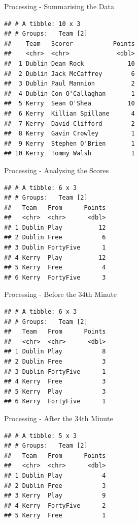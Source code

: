 \documentclass[ignorenonframetext,]{beamer}
\begin{document}
\begin{frame}[fragile]{Processing - Summarising the Data}
\protect\hypertarget{processing---summarising-the-data}{}

\begin{verbatim}
## # A tibble: 10 x 3
## # Groups:   Team [2]
##    Team   Scorer           Points
##    <chr>  <chr>             <dbl>
##  1 Dublin Dean Rock            10
##  2 Dublin Jack McCaffrey        6
##  3 Dublin Paul Mannion          2
##  4 Dublin Con O'Callaghan       1
##  5 Kerry  Sean O'Shea          10
##  6 Kerry  Killian Spillane      4
##  7 Kerry  David Clifford        2
##  8 Kerry  Gavin Crowley         1
##  9 Kerry  Stephen O'Brien       1
## 10 Kerry  Tommy Walsh           1
\end{verbatim}

\end{frame}

\begin{frame}[fragile]{Processing - Analysing the Scores}
\protect\hypertarget{processing---analysing-the-scores}{}

\begin{verbatim}
## # A tibble: 6 x 3
## # Groups:   Team [2]
##   Team   From      Points
##   <chr>  <chr>      <dbl>
## 1 Dublin Play          12
## 2 Dublin Free           6
## 3 Dublin FortyFive      1
## 4 Kerry  Play          12
## 5 Kerry  Free           4
## 6 Kerry  FortyFive      3
\end{verbatim}

\end{frame}

\begin{frame}[fragile]{Processing - Before the 34th Minute}
\protect\hypertarget{processing---before-the-34th-minute}{}

\begin{verbatim}
## # A tibble: 6 x 3
## # Groups:   Team [2]
##   Team   From      Points
##   <chr>  <chr>      <dbl>
## 1 Dublin Play           8
## 2 Dublin Free           3
## 3 Dublin FortyFive      1
## 4 Kerry  Free           3
## 5 Kerry  Play           3
## 6 Kerry  FortyFive      1
\end{verbatim}

\end{frame}

\begin{frame}[fragile]{Processing - After the 34th Minute}
\protect\hypertarget{processing---after-the-34th-minute}{}

\begin{verbatim}
## # A tibble: 5 x 3
## # Groups:   Team [2]
##   Team   From      Points
##   <chr>  <chr>      <dbl>
## 1 Dublin Play           4
## 2 Dublin Free           3
## 3 Kerry  Play           9
## 4 Kerry  FortyFive      2
## 5 Kerry  Free           1
\end{verbatim}

\end{frame}
\end{document}
